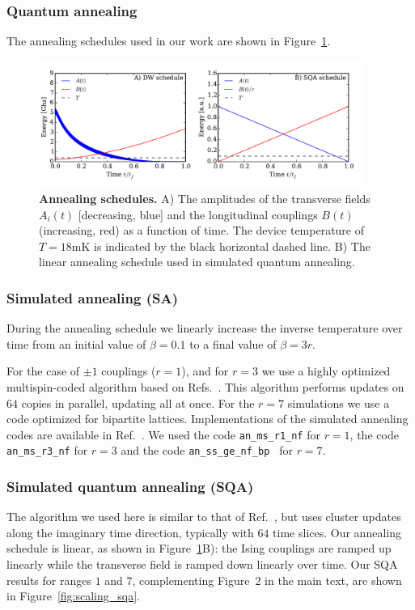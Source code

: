 \subsubsection{Quantum annealing}
The annealing schedules used in our work are shown in Figure~\ref{fig:schedule}.\\

%
\begin{figure}
\centering
\includegraphics[width=0.95\textwidth]{chapters/Speedup/sfigures/sfig01.pdf}
\caption{{\bf Annealing schedules.} A) The amplitudes of the transverse fields $A_i(t)$ [decreasing, blue] and the longitudinal couplings $B(t)$ (increasing, red) as a function of time. The device temperature of $T=18$mK is indicated by the black horizontal dashed line. B) The linear annealing schedule used in simulated quantum annealing.}
\label{fig:schedule}
\end{figure}
%
%

\subsubsection{Simulated annealing (SA)}
\label{sec:simulated-annealing}
During the annealing schedule we linearly increase the inverse temperature over time from an initial value of $\beta=0.1$ to a final value of $\beta=3r$.

For the case of $\pm1$ couplings ($r=1$), and  for $r=3$ we use a highly optimized multispin-coded algorithm based on Refs.~\cite{J.Stat.Phys.44.985,Comput.Phys.Commun.59.387}. This algorithm performs updates on $64$ copies in parallel, updating all at once. For the $r=7$ simulations we use a code optimized for bipartite lattices. Implementations of the simulated annealing codes are available in Ref.~\cite{sapaper}. We used the code {\tt an\_ms\_r1\_nf} for $r=1$, the code {\tt an\_ms\_r3\_nf} for $r=3$ and the code {\tt an\_ss\_ge\_nf\_bp } for $r=7$.\\


\subsubsection{Simulated quantum annealing (SQA)}
\label{sec:discr-time-quant}
The algorithm we used here is similar to that of Ref.~\cite{PhysRevB.66.094203}, but uses cluster updates along the imaginary time direction, typically with $64$ time slices. Our annealing schedule is linear, as shown in Figure~\ref{fig:schedule}B): the Ising couplings are ramped up linearly while the transverse field is ramped down linearly over time. Our SQA results for ranges $1$ and $7$, complementing Figure~2 in the main text, are shown in Figure~\ref{fig:scaling_sqa}.\\

